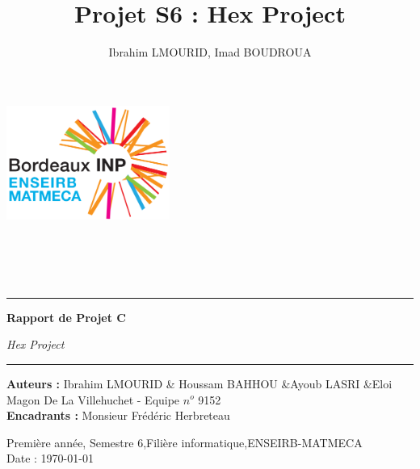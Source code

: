 \documentclass[a4paper,10pt]{article}
\begin{document}
\title{Projet S6 : Hex Project }
\author{Ibrahim LMOURID, Imad BOUDROUA}


\label{sec:title}
\thispagestyle{empty}


\includegraphics[width=0.4\textwidth]{Logo.png}
\\
\\
\\
\\
\\
\noindent\rule{\textwidth}{1pt}
\begin{flushright}
  \Huge
  \textbf{Rapport de Projet C}

    \vspace{15pt}
  \large 
  \textsl{Hex Project }

\end{flushright}
\noindent\rule{\textwidth}{1pt}


\large
\noindent\textbf{Auteurs   : }  \textup{Ibrahim LMOURID \& Houssam BAHHOU \&Ayoub LASRI \&Eloi Magon De La Villehuchet - Equipe $n^{o}$ 9152 } \\
\noindent\textbf{Encadrants :} \textup{ Monsieur Frédéric Herbreteau }

\normalsize
\begin{center}
  Première année, Semestre 6,Filière informatique,ENSEIRB-MATMECA\\
  Date : \today
\end{center}



\newpage
\tableofcontents

\newpage
\end{document}
